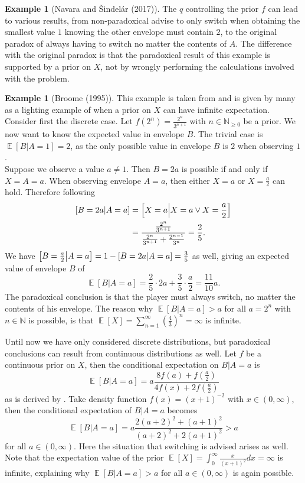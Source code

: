 \documentclass[a4paper]{report}
\theoremstyle{plain}
\theoremstyle{definition}
\newtheorem{example}[theorem]{Example}
\theoremstyle{remark}
\numberwithin{equation}{chapter}
\newcommand{\N}{\mathbb{N}}
\let\P\relax
\DeclareMathOperator{\P}{\mathbb{P}}
\DeclareMathOperator{\E}{\mathbb{E}}
\DeclareMathOperator{\1}{\mathbbm{1}}
\begin{document}
\begin{example}[Navara and Šindelár (2017)]
The $q$ controlling the prior $f$ can lead to various results, from non-paradoxical advise to only switch when obtaining the smallest value $1$ knowing the other envelope must contain $2$, to the original paradox of always having to switch no matter the contents of $A$. The difference with the original paradox is that the paradoxical result of this example is supported by a prior on $X$, not by wrongly performing the calculations involved with the problem.
\end{example}

\begin{example}[Broome (1995)]
This example is taken from \cite{Broome95} and is given by many as a lighting example of when a prior on $X$ can have infinite expectation. Consider first the discrete case. Let $f(2^n)=\frac{2^n}{3^{n+1}}$ with $n\in\N_{\geq 0}$ be a prior. We now want to know the expected value in envelope $B$. The trivial case is $\E[B|A=1]=2$, as the only possible value in envelope $B$ is $2$ when observing $1$.\\
Suppose we observe a value $a\neq1$. Then $B=2a$ is possible if and only if $X=A=a$. When observing envelope $A=a$, then either $X=a$ or $X=\frac{a}{2}$ can hold. Therefore following \cite{Broome95}
\begin{align}
\P[B=2a|A=a]&=\P\left[X=a\middle|X=a\lor X=\frac{a}{2}\right]\\
&=\frac{\frac{2^n}{3^{n+1}}}{\frac{2^n}{3^{n+1}}+\frac{2^{n-1}}{3^{n}}}=\frac{2}{5}.
\end{align}
We have $\P\left[B=\frac{a}{2}\middle|A=a\right]=1-\P[B=2a|A=a]=\frac{3}{5}$ as well, giving an expected value of envelope $B$ of
\begin{equation}
\E[B|A=a]=\frac{2}{5}\cdot2a+\frac{3}{5}\cdot\frac{a}{2}=\frac{11}{10}a.
\end{equation}
The paradoxical conclusion is that the player must always switch, no matter the contents of his envelope. The reason why $\E[B|A=a]>a$ for all $a=2^n$ with $n\in\N$ is possible, is that $\E[X]=\sum_{n=1}^\infty\left(\frac{4}{3}\right)^n=\infty$ is infinite.

Until now we have only considered discrete distributions, but paradoxical conclusions can result from continuous distributions as well. Let $f$ be a continuous prior on $X$, then the conditional expectation on $B|A=a$ is
\begin{equation}
\E[B|A=a]=a\frac{8f(a)+f\left(\frac{a}{2}\right)}{4f(x)+2f\left(\frac{a}{2}\right)}
\end{equation}
as is derived by \cite{Broome95}. Take density function $f(x)=(x+1)^{-2}$ with $x\in(0,\infty)$, then the conditional expectation of $B|A=a$ becomes
\begin{equation}
\E[B|A=a]=a\frac{2(a+2)^2+(a+1)^2}{(a+2)^2+2(a+1)^2}>a
\end{equation}
for all $a\in(0,\infty)$. Here the situation that switching is advised arises as well. Note that the expectation value of the prior $\E[X]=\int_0^\infty \frac{x}{(x+1)^2}dx=\infty$ is infinite, explaining why $\E[B|A=a]>a$ for all $a\in(0,\infty)$ is again possible.
\end{example}
\end{document}
